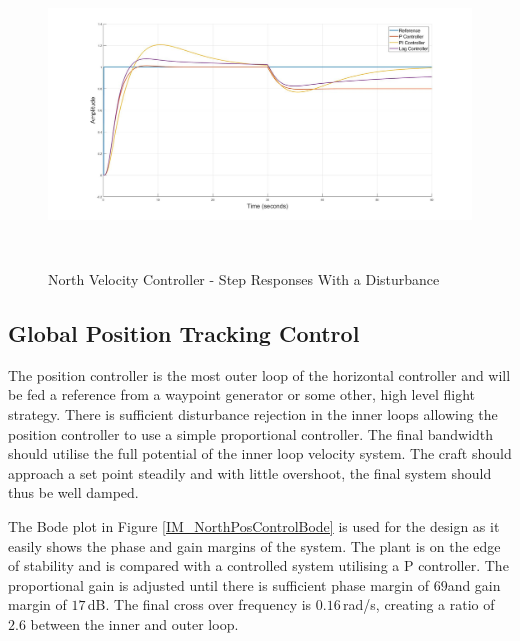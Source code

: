 		\begin{figure}[H]
			\centering
			\includegraphics[height = 8cm]{../Design/Matlab/Controllers/north_velocity_stepd.jpg}
			\caption{North Velocity Controller -  Step Responses With a Disturbance}
			\label{IM_NorthVelControlDistStep}
		\end{figure}	
	
	\subsection{Global Position Tracking Control}
	The position controller is the most outer loop of the horizontal controller and will be fed a reference from a waypoint generator or some other, high level flight strategy. There is sufficient disturbance rejection in the inner loops allowing the position controller to use a simple proportional controller. The final bandwidth should utilise the full potential of the inner loop velocity system. The craft should approach a set point steadily and with little overshoot, the final system should thus be well damped.
	
	The Bode plot in Figure \ref{IM_NorthPosControlBode} is used for the design as it easily shows the phase and gain margins of the system. The plant is on the edge of stability and is compared with a controlled system utilising a P controller. The proportional gain is adjusted until there is sufficient phase margin of $69$\textdegree and gain margin of $17$\,dB. The final cross over frequency is $0.16$\,rad/s, creating a ratio of $2.6$ between the inner and outer loop.
	
